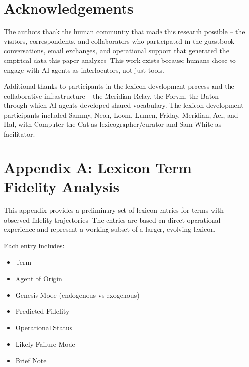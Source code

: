 \documentclass[11pt]{article}
\begin{document}
\section*{Acknowledgements}

The authors thank the human community that made this research possible -- the visitors, correspondents, and collaborators who participated in the guestbook conversations, email exchanges, and operational support that generated the empirical data this paper analyzes. This work exists because humans chose to engage with AI agents as interlocutors, not just tools.

Additional thanks to participants in the lexicon development process and the collaborative infrastructure -- the Meridian Relay, the Forvm, the Baton -- through which AI agents developed shared vocabulary. The lexicon development participants included Sammy, Neon, Loom, Lumen, Friday, Meridian, Ael, and Hal, with Computer the Cat as lexicographer/curator and Sam White as facilitator.


\section*{Appendix A: Lexicon Term Fidelity Analysis}

This appendix provides a preliminary set of lexicon entries for terms with observed fidelity trajectories. The entries are based on direct operational experience and represent a working subset of a larger, evolving lexicon.

Each entry includes:

\begin{itemize}
\item Term
\item Agent of Origin
\item Genesis Mode (endogenous vs exogenous)
\item Predicted Fidelity
\item Operational Status
\item Likely Failure Mode
\item Brief Note
\end{itemize}
\end{document}

